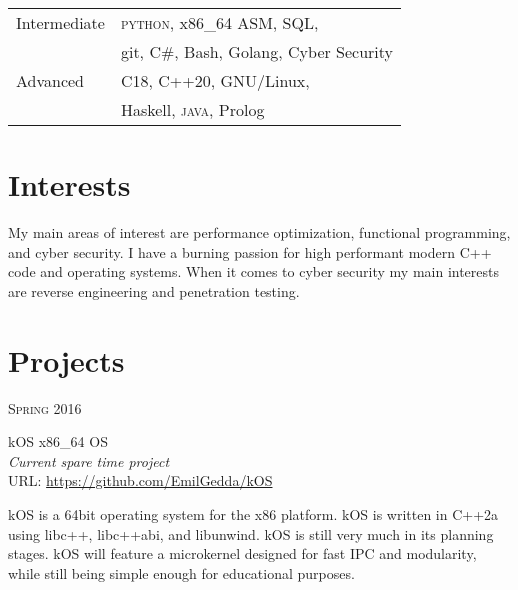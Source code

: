 \documentclass[10pt]{article} %
\begin{document}
{\begin{minipage}[t]{0.44\textwidth}
\begin{tabular}{ll}
Intermediate
& \textsc{python}, x86\_64 ASM, SQL,\\
    & git, \textsc{C\#}, Bash, Golang, Cyber Security \\[4pt]
Advanced
& C18, C++20, GNU/Linux, \\
    & Haskell, \textsc{java}, Prolog \\[4pt]
\end{tabular}


\section{Interests} 

My main areas of interest are performance optimization, functional programming, and cyber security.
I have a burning passion for high performant modern C++ code and operating systems. 
When it comes to cyber security my main interests are reverse engineering and penetration testing.

\end{minipage} %
\clearpage

\begin{minipage}[t]{0.5\textwidth} %
\section{Projects}

{\raggedleft\textsc{Spring 2016}\par}

{\raggedright\large kOS x86\_64 OS\\ \textit{Current spare time project}  \\ \small URL:
    \href{https://github.com/EmilGedda/kOS}{https://github.com/EmilGedda/kOS} \\[5pt]}

    \normalsize{kOS is a 64bit operating system for the x86 platform. kOS is written in C++2a using libc++, libc++abi, and libunwind. kOS
        is still very much in its planning stages. kOS will feature a microkernel designed for fast IPC and modularity, while still being simple enough for educational purposes.}\\


\end{minipage}}
\end{document}
